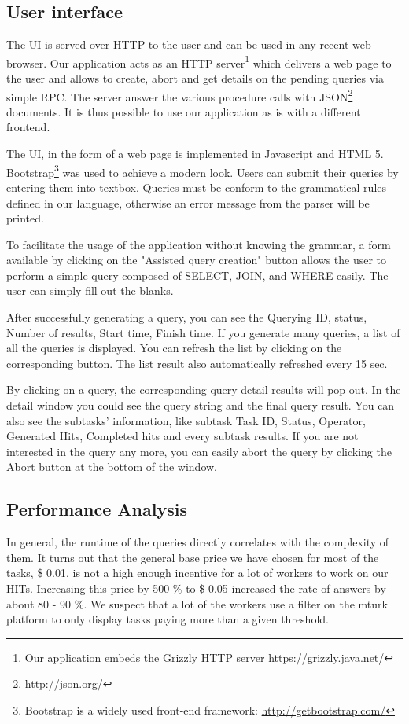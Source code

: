 \documentclass{article}
\begin{document}
\subsection{User interface}

The UI is served over HTTP to the user and can be used in any recent web
browser. Our application acts as an HTTP server\footnote{Our application embeds
the Grizzly HTTP server \url{https://grizzly.java.net/}} which delivers a web page to the
user and allows to create, abort and get details on the pending
queries via simple RPC. The server answer the various procedure calls with
JSON\footnote{\url{http://json.org/}} documents. It is thus possible to use our
application as is with a different frontend.

The UI, in the form of a web page is implemented in Javascript and HTML 5.
Bootstrap\footnote{Bootstrap is a widely used front-end framework:
\url{http://getbootstrap.com/}} was used to achieve a modern look.
Users can submit their queries by entering them into textbox. Queries must be conform to the
grammatical rules defined in our language, otherwise an error message from the parser will be printed.

To facilitate the usage of the application without knowing the grammar, a form
available by clicking on the "Assisted query creation" button allows the user
to perform a simple query composed of SELECT, JOIN, and WHERE easily. The user
can simply fill out the blanks.

After successfully generating a query, you can see the Querying ID, status, Number of results, Start time, Finish time. If you generate many queries, a list of all the queries is displayed. You can refresh the list by clicking on the corresponding button. The list result also automatically refreshed every 15 sec.

By clicking on a query, the corresponding query detail results will pop out. In the detail window you could see the query string and the final query result. You can also see the subtasks' information, like subtask Task ID, Status, Operator, Generated Hits, Completed hits and every subtask results. If you are not interested in the query any more, you can easily abort the query by clicking the Abort button at the bottom of the window.

\subsection{Performance Analysis}
In general, the runtime of the queries directly correlates with the complexity of them.
It turns out that the general base price we have chosen for most of the tasks, \$ 0.01, is not a high enough incentive for a lot of workers to work on our HITs. Increasing this price by 500 \% to \$ 0.05 increased the rate of answers by about 80 - 90 \%. We suspect that a lot of the workers use a filter on the mturk platform to only display tasks paying more than a given threshold. 
\end{document}
